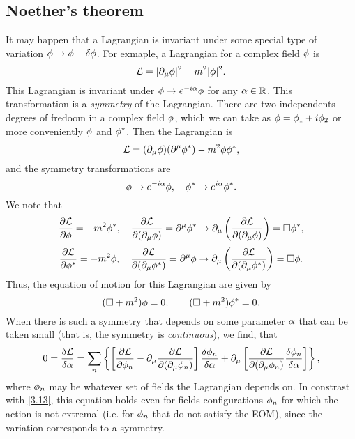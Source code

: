 \subsection{Noether's theorem}
It may happen that a Lagrangian is invariant under some special type of variation $\phi\to \phi+\delta\phi  $. For exmaple, a Lagrangian for a complex field $\phi $ is
\begin{equation}
  \mathcal{L} = |\partial_\mu \phi |^2-m^2|\phi |^2.
\end{equation}
This Lagrangian is invariant under $\phi\to e^{-i\alpha }\phi$ for any $\alpha\in\mathbb{R}$. This transformation is a \textit{symmetry} of the Lagrangian. There are two independents degrees of fredoom in a complex field $\phi$, which we can take as $\phi=\phi_1+i\phi_2 $ or more conveniently $\phi$ and $\phi^*$. Then the Lagrangian is
\begin{equation}
  \mathcal{L} =(\partial_\mu\phi )(\partial^\mu \phi^*)-m^2\phi\phi^*,
\end{equation}
and the symmetry transformations are
\begin{equation}
  \phi\to e^{-i\alpha }\phi,\quad \phi^*\to e^{i\alpha }\phi^*.
\end{equation}
We note that 
\begin{equation}
  \pdv{\mathcal{L}}{\phi}=-m^2\phi^*,\quad \pdv{\mathcal{L}}{(\partial_\mu\phi)}=\partial^\mu \phi^* \to \partial_\mu \left(\pdv{\mathcal{L}}{(\partial_\mu\phi)}\right)=\Box \phi^* ,
\end{equation}
\begin{equation}
  \pdv{\mathcal{L}}{\phi^* }=-m^2\phi,\quad \pdv{\mathcal{L}}{(\partial_\mu\phi^* )}=\partial^\mu \phi \to \partial_\mu \left(\pdv{\mathcal{L}}{(\partial_\mu\phi^* )}\right)=\Box \phi.
\end{equation}
Thus, the equation of motion for this Lagrangian are given by
\begin{equation}
  (\Box +m^2)\phi=0,\qquad (\Box +m^2)\phi^*=0.
\end{equation}
When there is such a symmetry that depends on some parameter $\alpha$ that can be taken small (that is, the symmetry is \textit{continuous}), we find, that
\begin{equation}\label{3.22}
  0=\frac{\delta \mathcal{L}}{\delta\alpha }=\sum_n\left\{\left[\pdv{\mathcal{L}}{\phi_n}-\partial_\mu \pdv{\mathcal{L}}{(\partial_\mu\phi_n )}\right]\frac{\delta\phi_n}{\delta\alpha }+\partial_\mu \left[\pdv{\mathcal{L}}{(\partial_\mu\phi_n)}\frac{\delta\phi_n}{\delta\alpha }\right]\right\},
\end{equation}
where $\phi_n$ may be whatever set of fields the Lagrangian depends on. In constrast with \eqref{3.13}, this equation holds even for fields configurations $\phi_n $ for which the action is not extremal (i.e. for $\phi_n$ that do not satisfy the EOM), since the variation corresponds to a symmetry.

